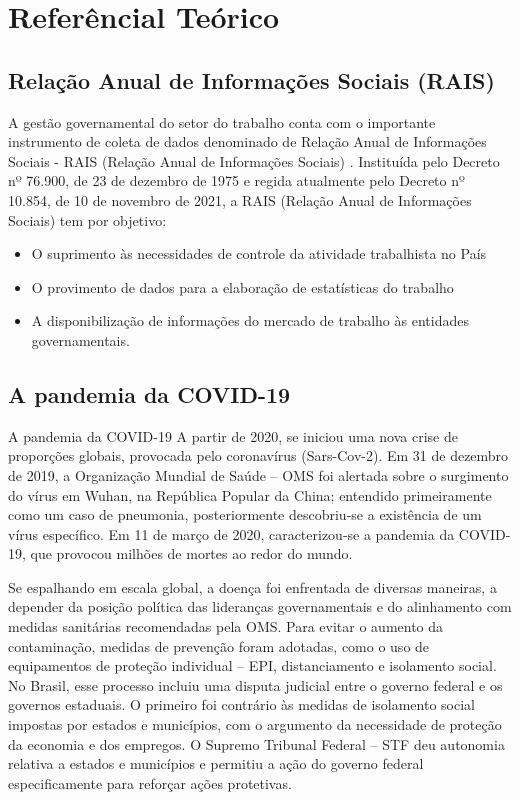\section{Referêncial Teórico}

\subsection{Relação Anual de Informações Sociais (RAIS)}

A gestão governamental do setor do trabalho conta com o importante instrumento de coleta de dados denominado de Relação Anual de Informações Sociais - RAIS (Relação Anual de Informações Sociais) \cite{Sobre_a_RAIS}. Instituída pelo Decreto nº 76.900, de 23 de dezembro de 1975 e regida atualmente pelo Decreto nº 10.854, de 10 de novembro de 2021, a RAIS (Relação Anual de Informações Sociais) tem por objetivo: 

\begin{itemize}
	\item O suprimento às necessidades de controle da atividade trabalhista no País
	\item O provimento de dados para a elaboração de estatísticas do trabalho
	\item A disponibilização de informações do mercado de trabalho às entidades governamentais.
\end{itemize}

\subsection{A pandemia da COVID-19}

A pandemia da COVID-19 A partir de 2020, se iniciou uma nova crise de proporções globais, provocada pelo coronavírus (Sars-Cov-2). Em 31 de dezembro de 2019, a Organização Mundial de Saúde – OMS foi alertada sobre o surgimento do vírus em Wuhan, na República Popular da China; entendido primeiramente como um caso de pneumonia, posteriormente descobriu-se a existência de um vírus específico. Em 11 de março de 2020, caracterizou-se a pandemia da COVID-19, que provocou milhões de mortes ao redor do mundo. 

Se espalhando em escala global, a doença foi enfrentada de diversas maneiras, a depender da posição política das lideranças governamentais e do alinhamento com medidas sanitárias recomendadas pela OMS. Para evitar o aumento da contaminação, medidas de prevenção foram adotadas, como o uso de equipamentos de proteção individual – EPI, distanciamento e isolamento social. No Brasil, esse processo incluiu uma disputa judicial entre o governo federal e os governos estaduais. O primeiro foi contrário às medidas de isolamento social impostas por estados e municípios, com o argumento da necessidade de proteção da economia e dos empregos. O Supremo Tribunal Federal – STF deu autonomia relativa a estados e municípios e permitiu a ação do governo federal especificamente para reforçar ações protetivas.


